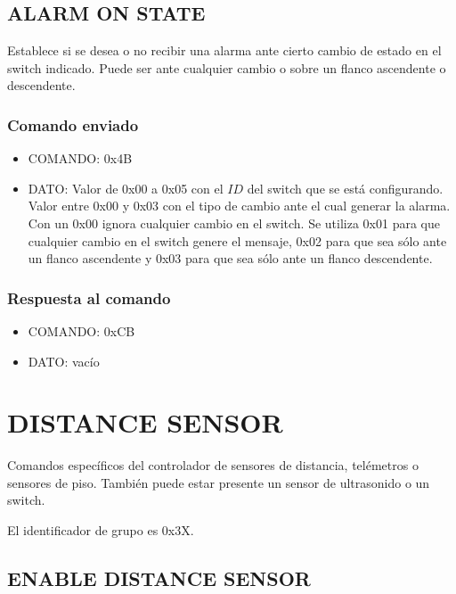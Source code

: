 \documentclass[a4paper,10pt]{article}
\begin{document}
\subsection{ALARM ON STATE}
\label{alarm_on_state_servos}

Establece si se desea o no recibir una alarma ante cierto cambio de estado en el switch indicado.
Puede ser ante cualquier cambio o sobre un flanco ascendente o descendente.

\subsubsection*{Comando enviado}

\begin{itemize}
	\item{COMANDO:} 0x4B
	\item{DATO:} Valor de 0x00 a 0x05 con el $ID$ del switch que se est\'a configurando.
	Valor entre 0x00 y 0x03 con el tipo de cambio ante el cual generar la alarma.
	Con un 0x00 ignora cualquier cambio en el switch.
	Se utiliza 0x01 para que cualquier cambio en el switch genere el mensaje, 
	0x02 para que sea s\'olo ante un flanco ascendente y 0x03 para que sea s\'olo ante un flanco descendente.

\end{itemize}

\subsubsection*{Respuesta al comando}

\begin{itemize}
	\item{COMANDO:} 0xCB
	\item{DATO:} vac\'io
\end{itemize}

\section{DISTANCE SENSOR}
\label{grupo_distance_sensor}

Comandos espec\'ificos del controlador de sensores de distancia, tel\'emetros o sensores de piso.
Tambi\'en puede estar presente un sensor de ultrasonido o un switch.

El identificador de grupo es 0x3X.

\subsection{ENABLE DISTANCE SENSOR}
\label{enable_distance_sensor}
\end{document}
